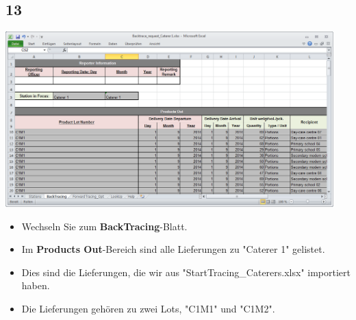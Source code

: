 \documentclass{beamer}
\begin{document}
\subsection{13}
\begin{frame}
	\begin{center}
  		\includegraphics[width=0.95\textwidth]{13.png}
	\end{center}
	\begin{itemize}
		\item Wechseln Sie zum \textbf{BackTracing}-Blatt.
		\item Im \textbf{Products Out}-Bereich sind alle Lieferungen zu "Caterer 1" gelistet.
		\item Dies sind die Lieferungen, die wir aus "StartTracing\_Caterers.xlsx" importiert haben.
		\item Die Lieferungen gehören zu zwei Lots, "C1M1" und "C1M2".
	\end{itemize}
\end{frame}
\end{document}
